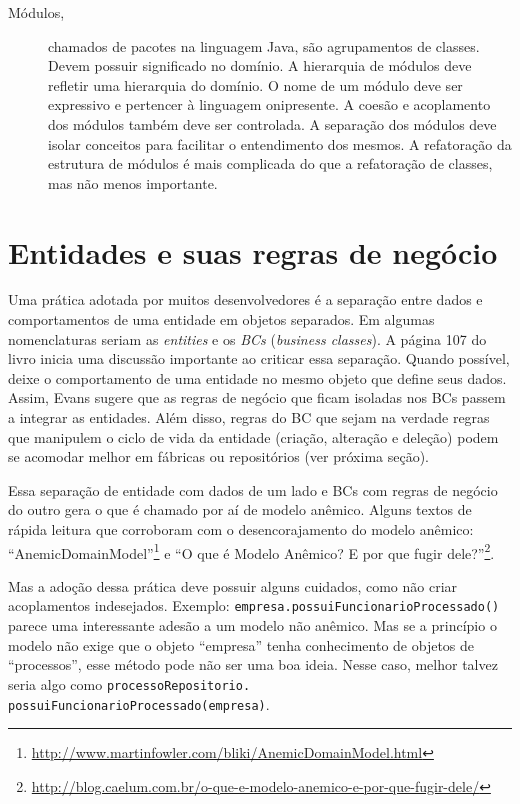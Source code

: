 \documentclass[a4paper, 12pt]{article}
\newcommand{\code}[1]{\texttt{#1}}
\begin{document}
\begin{description}
\item [Módulos,] chamados de pacotes na linguagem Java, são agrupamentos de classes. Devem possuir significado no domínio. A hierarquia de módulos deve refletir uma hierarquia do domínio. O nome de um módulo deve ser expressivo e pertencer à linguagem onipresente. A coesão e acoplamento dos módulos também deve ser controlada. A separação dos módulos deve isolar conceitos para facilitar o entendimento dos mesmos. A refatoração da estrutura de módulos é mais complicada do que a refatoração de classes, mas não menos importante.

\end{description}

\section{Entidades e suas regras de negócio}

Uma prática adotada por muitos desenvolvedores é a separação entre dados e comportamentos de uma entidade em objetos separados. Em algumas nomenclaturas seriam as \emph{entities} e os \emph{BCs} (\emph{business classes}). A página 107 do livro inicia uma discussão importante ao criticar essa separação. Quando possível, deixe o comportamento de uma entidade no mesmo objeto que define seus dados. Assim, Evans sugere que as regras de negócio que ficam isoladas nos BCs passem a integrar as entidades. Além disso, regras do BC que sejam na verdade regras que manipulem o ciclo de vida da entidade (criação, alteração e deleção) podem se acomodar melhor em fábricas ou repositórios (ver próxima seção).

Essa separação de entidade com dados de um lado e BCs com regras de negócio do outro gera o que é chamado por aí de modelo anêmico. Alguns textos de rápida leitura que corroboram com o desencorajamento do modelo anêmico:  ``AnemicDomainModel''\footnote{\url{http://www.martinfowler.com/bliki/AnemicDomainModel.html}} e ``O que é Modelo Anêmico? E por que fugir dele?''\footnote{\url{http://blog.caelum.com.br/o-que-e-modelo-anemico-e-por-que-fugir-dele/}}.

Mas a adoção dessa prática deve possuir alguns cuidados, como não criar acoplamentos indesejados. Exemplo: \code{empresa.possuiFuncionarioProcessado()} parece uma interessante adesão a um modelo não anêmico. Mas se a princípio o modelo não exige que o objeto ``empresa'' tenha conhecimento de objetos de ``processos'', esse método pode não ser uma boa ideia. Nesse caso, melhor talvez seria algo como \code{processoRepositorio. possuiFuncionarioProcessado(empresa)}.
\end{document}
